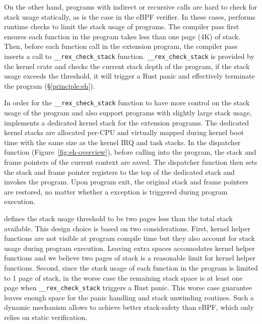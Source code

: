 On the other hand, programs with indirect or recursive calls are hard to check
    for stack usage statically, as is the case in the eBPF verifier.
In these cases, \projname{} performs runtime checks to limit the stack usage of
    programs.
The \projname{} compiler pass first ensures each function in the program takes
    less than one page (4K) of stack.
Then, before each function call in the extension program, the \projname{}
    compiler pass inserts a call to \texttt{\_\_rex\_check\_stack} function.
\texttt{\_\_rex\_check\_stack} is provided by the kernel crate and checks the
    current stack depth of the program, if the stack usage exceeds the
    threshold, it will trigger a Rust panic and effectively terminate the
    program (\S\ref{principle:eh}).

In order for the \texttt{\_\_rex\_check\_stack} function to have more control
    on the stack usage of the program and also support programs with slightly
    large stack usage, \projname{} implements a dedicated kernel stack for the
    extension programs.
The dedicated kernel stacks are allocated per-CPU and virtually mapped during
    kernel boot time with the same size as the kernel IRQ and task stacks.
In the dispatcher function (Figure~\ref{fig:eh-overview}), before calling into
    the \projname{} program, the stack and frame pointers of the current
    context are saved.
The dispatcher function then sets the stack and frame pointer registers to the
    top of the dedicated stack and invokes the program.
Upon program exit, the original stack and frame pointers are restored, no
    matter whether a exception is triggered during program execution.

\projname{} defines the stack usage threshold to be two pages less than the
    total stack available.
This design choice is based on two considerations.
First, kernel helper functions are not visible at program compile time but they
    also account for stack usage during program execution.
Leaving extra spaces accomodates kernel helper functions and we believe two
    pages of stack is a reasonable limit for kernel helper functions.
Second, since the stack usage of each function in the program is limited to
    1 page of stack, in the worse case the remaining stack space is at least
    one page when \texttt{\_\_rex\_check\_stack} triggers a Rust panic.
This worse case guarantee leaves enough space for the panic handling and stack
    unwinding routines.
Such a dynamic mechanism allows \projname{} to achieve better stack-safety than
    eBPF, which only relies on static verification.

